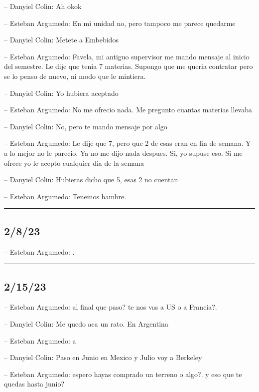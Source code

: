 -- Danyiel Colin: Ah okok

-- Esteban Argumedo: En mi unidad no, pero tampoco me parece quedarme

-- Danyiel Colin: Metete a Embebidos

-- Esteban Argumedo: Favela, mi antiguo supervisor me mando mensaje al
inicio del semestre. Le dije que tenia 7 materias. Supongo que me queria
contratar pero se lo penso de nuevo, ni modo que le mintiera.

-- Danyiel Colin: Yo hubiera aceptado

-- Esteban Argumedo: No me ofrecio nada. Me pregunto cuantas materias
llevaba

-- Danyiel Colin: No, pero te mando mensaje por algo

-- Esteban Argumedo: Le dije que 7, pero que 2 de esas eran en fin de
semana. Y a lo mejor no le parecio. Ya no me dijo nada despues. Si, yo
supuse eso. Si me ofrece yo le acepto cualquier dia de la semana

-- Danyiel Colin: Hubieras dicho que 5, esas 2 no cuentan

-- Esteban Argumedo: Tenemos hambre.

\begin{center}\rule{0.5\linewidth}{0.5pt}\end{center}

\hypertarget{section-183}{%
\subsection{2/8/23}\label{section-183}}

-- Esteban Argumedo: .

\begin{center}\rule{0.5\linewidth}{0.5pt}\end{center}

\hypertarget{section-184}{%
\subsection{2/15/23}\label{section-184}}

-- Esteban Argumedo: al final que paso? te nos vas a US o a Francia?.

-- Danyiel Colin: Me quedo aca un rato. En Argentina

-- Esteban Argumedo: a

-- Danyiel Colin: Paso en Junio en Mexico y Julio voy a Berkeley

-- Esteban Argumedo: espero hayas comprado un terreno o algo?. y eso que
te quedas hasta junio?

